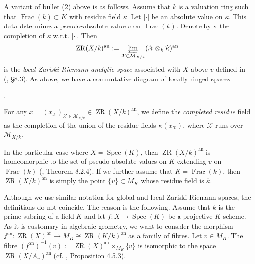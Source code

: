 \documentclass [11pt,reqno]{amsart}
\newcommand{\1}{\mathmybb{1}}
\def\cM{{\mathcal{M}}}
\def\cX{{\mathcal{X}}}
\def\an{\operatorname{an}}
\def\Frac{\operatorname{Frac}}
\def\Spec{\operatorname{Spec}}
\def\ZR{\operatorname{ZR}}
\begin{document}
A variant of bullet (2) above is as follows. Assume that $k$ is a valuation ring such that $\Frac(k)\subset K$ with residue field $\kappa$. Let $|\cdot|$ be an absolute value on $\kappa$. This data determines a pseudo-absolute value $v$ on $\Frac(k)$. Denote by $\widehat{\kappa}$ the completion of $\kappa$ w.r.t. $|\cdot|$. Then 
	\begin{align*}
	\ZR(X/k)^{\an} := \displaystyle\varprojlim_{\cX \in \cM_{X/k}} (\cX\otimes_{k}\widehat{\kappa})^{\an}
	\end{align*}
	is the \emph{local Zariski-Riemann analytic space} associated with $X$ above $v$ defined in (\cite{Sedillot_pav}, \S 8.3). As above, we have a commutative diagram of locally ringed spaces
	\begin{center}
.
	\end{center}
For any $x=(x_{\cX})_{\cX\in\cM_{X/k}}\in \ZR(X/k)^{\an}$, we define the \emph{completed residue} field as the completion of the union of the residue fields $\kappa(x_{\cX})$, where $\cX$ runs over $\cM_{X/k}$.

In the particular case where $X=\Spec(K)$, then $\ZR(X/k)^{\an}$ is homeomorphic to the set of pseudo-absolute values on $K$ extending $v$ on $\Frac(k)$ (\cite{Sedillot_pav}, Theorem 8.2.4). If we further assume that $K=\Frac(k)$, then $\ZR(X/k)^{\an}$ is simply the point $\{v\}\subset M_{K}$ whose residue field is $\widehat{\kappa}$. %
	
	
\begin{remark}
\label{rem:variant_ZR_analytic}
Although we use similar notation for global and local Zariski-Riemann spaces, the definitions do not coincide. The reason is the following. Assume that $k$ is the prime subring of a field $K$ and let $f:X\to \Spec(K)$ be a projective $K$-scheme. As it is customary in algebraic geometry, we want to consider the morphism $f^{\an}:\ZR(X)^{\an} \to M_{K}\cong \ZR(K/k)^{\an}$ as a family of fibres. Let $v\in M_{K}$. The fibre $(f^{\an})^{-1}(v) := \ZR(X)^{\an} \times_{M_{K}} \{v\}$ is isomorphic to the space $\ZR(X/A_{v})^{\an}$ (cf. \cite{LemanissierPoineau24}, Proposition 4.5.3).
\end{remark}
\end{document}
